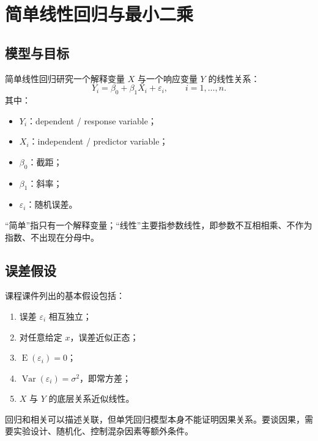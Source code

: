 \documentclass[11pt,a4paper]{article}
\theoremstyle{definition}
\theoremstyle{plain}
\theoremstyle{remark}
\newcommand{\E}{\operatorname{E}}
\newcommand{\Var}{\operatorname{Var}}
\begin{document}
\section{简单线性回归与最小二乘}
\label{sec:slr}

\subsection{模型与目标}

简单线性回归研究一个解释变量 $X$ 与一个响应变量 $Y$ 的线性关系：
\[
    Y_i=\beta_0+\beta_1X_i+\varepsilon_i,\qquad i=1,\ldots,n.
\]
其中：
\begin{itemize}
    \item $Y_i$：dependent / response variable；
    \item $X_i$：independent / predictor variable；
    \item $\beta_0$：截距；
    \item $\beta_1$：斜率；
    \item $\varepsilon_i$：随机误差。
\end{itemize}

\begin{keybox}[简单线性回归的含义]
“简单”指只有一个解释变量；“线性”主要指参数线性，即参数不互相相乘、不作为指数、不出现在分母中。
\end{keybox}

\subsection{误差假设}

课程课件列出的基本假设包括：
\begin{enumerate}
    \item 误差 $\varepsilon_i$ 相互独立；
    \item 对任意给定 $x$，误差近似正态；
    \item $\E(\varepsilon_i)=0$；
    \item $\Var(\varepsilon_i)=\sigma^2$，即常方差；
    \item $X$ 与 $Y$ 的底层关系近似线性。
\end{enumerate}

\begin{warnbox}[回归与因果]
回归和相关可以描述关联，但单凭回归模型本身不能证明因果关系。要谈因果，需要实验设计、随机化、控制混杂因素等额外条件。
\end{warnbox}
\end{document}
